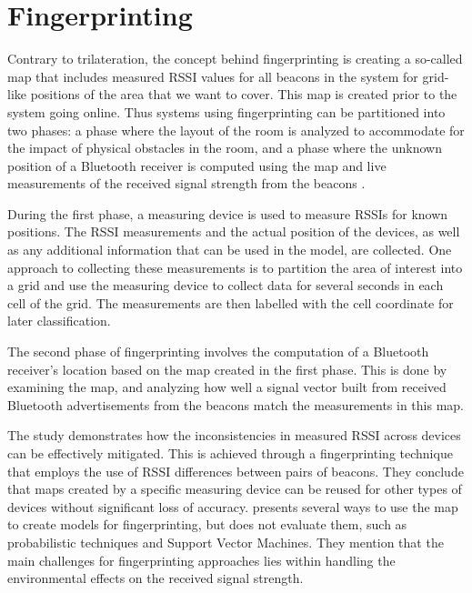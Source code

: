 \section{Fingerprinting}\label{sec:fingerprinting}
Contrary to trilateration, the concept behind fingerprinting is creating a so-called map that includes measured RSSI values for all beacons in the system for grid-like positions of the area that we want to cover.
This map is created prior to the system going online.
Thus systems using fingerprinting can be partitioned into two phases: a phase where the layout of the room is analyzed to accommodate for the impact of physical obstacles in the room, and a phase where the unknown position of a Bluetooth receiver is computed using the map and live measurements of the received signal strength from the beacons \cite{presence_ble_review, taking_localization_to_the_wild}.

During the first phase, a measuring device is used to measure RSSIs for known positions.
The RSSI measurements and the actual position of the devices, as well as any additional information that can be used in the model, are collected. 
One approach to collecting these measurements is to partition the area of interest into a grid and use the measuring device to collect data for several seconds in each cell of the grid.\cite{improving_indoor_localization}
The measurements are then labelled with the cell coordinate for later classification.

The second phase of fingerprinting involves the computation of a Bluetooth receiver's location based on the map created in the first phase. 
This is done by examining the map, and analyzing how well a signal vector built from received Bluetooth advertisements from the beacons match the measurements in this map.

The study \cite{taking_localization_to_the_wild} demonstrates how the inconsistencies in measured RSSI across devices can be effectively mitigated. This is achieved through a fingerprinting technique that employs the use of RSSI differences between pairs of beacons.
They conclude that maps created by a specific measuring device can be reused for other types of devices without significant loss of accuracy. 
\citeauthor{presence_ble_review}\cite{presence_ble_review} presents several ways to use the map to create models for fingerprinting, but does not evaluate them, such as probabilistic techniques and Support Vector Machines. 
They mention that the main challenges for fingerprinting approaches lies within handling the environmental effects on the received signal strength.

